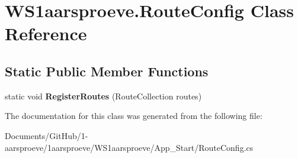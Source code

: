 \hypertarget{class_w_s1aarsproeve_1_1_route_config}{}\section{W\+S1aarsproeve.\+Route\+Config Class Reference}
\label{class_w_s1aarsproeve_1_1_route_config}
\subsection*{Static Public Member Functions}
\begin{DoxyCompactItemize}
\item 
\hypertarget{class_w_s1aarsproeve_1_1_route_config_a0a44701cec35dee94a54f52f1b6ec59d}{}static void {\bfseries Register\+Routes} (Route\+Collection routes)\label{class_w_s1aarsproeve_1_1_route_config_a0a44701cec35dee94a54f52f1b6ec59d}

\end{DoxyCompactItemize}


The documentation for this class was generated from the following file\+:\begin{DoxyCompactItemize}
\item 
Documents/\+Git\+Hub/1-\/aarsproeve/1aarsproeve/\+W\+S1aarsproeve/\+App\+\_\+\+Start/Route\+Config.\+cs\end{DoxyCompactItemize}
